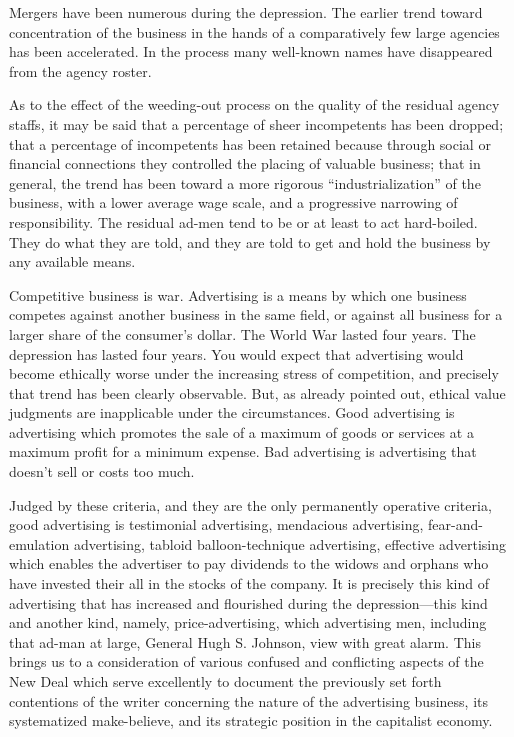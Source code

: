 \documentclass[nohyper,openany,nobib]{tufte-book}
\begin{document}
Mergers have been numerous during the depression. The earlier trend
toward concentration of the business in the hands of a comparatively few
large agencies has been accelerated. In the process many well-known
names have disappeared from the agency roster.

As to the effect of the weeding-out process on the quality of the
residual agency staffs, it may be said that a percentage of sheer
incompetents has been dropped; that a percentage of incompetents has
been retained because through social or financial connections they
controlled the placing of valuable business; that in general, the trend
has been toward a more rigorous ``industrialization'' of the business,
with a lower average wage scale, and a progressive narrowing of
responsibility. The residual ad-men tend to be or at least to act
hard-boiled. They do what they are told, and they are told to get and
hold the business by any available means.

Competitive business is war. Advertising is a means by which one
business competes against another business in the same field, or against
all business for a larger share of the consumer's dollar. The World War
lasted four years. The depression has lasted four years. You would
expect that advertising would become ethically worse under the
increasing stress of competition, and precisely that trend has been
clearly observable. But, as already pointed out, ethical value judgments
are inapplicable under the circumstances. Good advertising is
advertising which promotes the sale of a maximum of goods or services at
a maximum profit for a minimum expense. Bad advertising is advertising
that doesn't sell or costs too much.

Judged by these criteria, and they are the only permanently operative
criteria, good advertising is testimonial advertising, mendacious
advertising, fear-and-emulation advertising, tabloid balloon-technique
advertising, effective advertising which enables the advertiser to pay
dividends to the widows and orphans who have invested their all in the
stocks of the company. It is precisely this kind of advertising that has
increased and flourished during the depression---this kind and another
kind, namely, price-advertising, which advertising men, including that
ad-man at large, General Hugh S. Johnson, view with great alarm. This
brings us to a consideration of various confused and conflicting aspects
of the New Deal which serve excellently to document the previously set
forth contentions of the writer concerning the nature of the advertising
business, its systematized make-believe, and its strategic position in
the capitalist economy.
\end{document}
